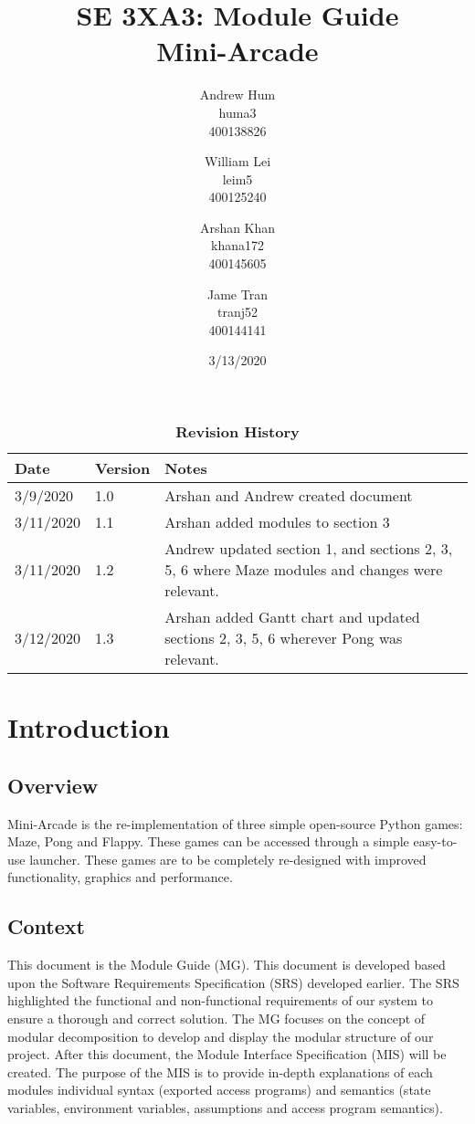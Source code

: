 \documentclass[12pt, titlepage]{article}
\title{SE 3XA3: Module Guide\\Mini-Arcade}
\author{Andrew Hum \\ huma3 \\ 400138826 \and
		William Lei \\ leim5 \\ 400125240 \and
		Arshan Khan \\ khana172 \\ 400145605 \and
		Jame Tran \\ tranj52 \\ 400144141
}
\date{3/13/2020}
\begin{document}
\maketitle

\tableofcontents
\newpage
\listoftables
\listoffigures

\begin{table}[bp]
\caption{\bf Revision History}
\begin{tabularx}{\textwidth}{p{3cm}p{2cm}X}
\toprule {\bf Date} & {\bf Version} & {\bf Notes}\\
\midrule
3/9/2020 & 1.0 & Arshan and Andrew created document\\
3/11/2020 & 1.1 & Arshan added modules to section 3\\
3/11/2020 & 1.2 & Andrew updated section 1, and sections 2, 3, 5, 6 where Maze modules and changes were relevant.\\
3/12/2020 & 1.3 & Arshan added Gantt chart and updated sections 2, 3, 5, 6 wherever Pong was relevant.\\
\bottomrule
\end{tabularx}
\end{table}

\newpage


\section{Introduction}
\subsection{Overview}
Mini-Arcade is the re-implementation of three simple open-source Python games: Maze, Pong and Flappy. These games can be accessed through a simple easy-to-use launcher. These games are to be completely re-designed with improved functionality, graphics and performance.
\subsection{Context}
This document is the Module Guide (MG). This document is developed based upon the Software Requirements Specification (SRS) developed earlier. The SRS highlighted the functional and non-functional requirements of our system to ensure a thorough and correct solution. The MG focuses on the concept of modular decomposition to develop and display the modular structure of our project. After this document, the Module Interface Specification (MIS) will be created. The purpose of the MIS is to provide in-depth explanations of each modules individual syntax (exported access programs) and semantics (state variables, environment variables, assumptions and access program semantics).
\end{document}
